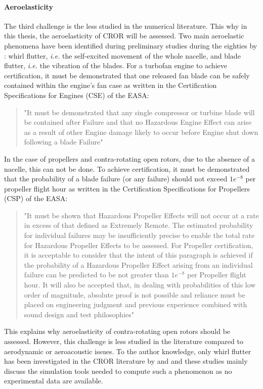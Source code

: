\paragraph{Aeroelasticity}
The third challenge is the less studied in the numerical literature.
This why in this thesis, the aeroelasticity of CROR will be assessed.
Two main aeroelastic phenomena have been identified during preliminary studies
during the eighties by \citet{Hager1988}: whirl flutter, \emph{i.e.} the self-excited
movement of the whole nacelle, and blade flutter, \emph{i.e.} the vibration
of the blades.
For a turbofan engine to achieve certification, it must be 
demonstrated that one released fan blade can be safely contained 
within the engine’s fan case as written in the 
Certification Specifications for Engines (CSE) of the EASA:
\begin{quote}
	"It must be demonstrated that any single compressor or turbine blade will be contained after Failure and 
that no Hazardous Engine Effect can arise as a result of other Engine damage likely to occur before 
Engine shut down following a blade Failure"
\end{quote}
In the case of propellers and contra-rotating open rotors, due to the absence of a nacelle,
this can not be done. To achieve certification, it must be demonstrated that the probability of a blade
failure (or any failure) should not exceed $1e^{-8}$ per propeller flight hour as written in 
the Certification Specifications for Propellers (CSP) of the EASA:
\begin{quote}
	"It must be shown that Hazardous Propeller Effects will not occur at a rate in excess of that defined 
as Extremely Remote. The estimated probability for individual failures may be insufficiently precise 
to enable the total rate for Hazardous Propeller Effects to be assessed. For Propeller certification, it 
is acceptable to consider that the intent of this paragraph is achieved if the probability of a 
Hazardous Propeller Effect arising from an individual failure can be predicted to be not greater than 
$1e^{-8}$ per Propeller flight hour. It will also be accepted that, in dealing with probabilities of this low 
order of magnitude, absolute proof is not possible and reliance must be placed on engineering 
judgment and previous experience combined with sound design and test philosophies" 
\end{quote}
This explains why aeroelasticity of contra-rotating open rotors should be assessed.
However, this challenge is less studied in the literature compared to 
aerodynamic or aeroacoustic issues.
To the author knowledge, only whirl flutter has been investigated
in the CROR literature by \citet{CISicot2011a} and 
\citet{Verley2013} and these studies mainly
discuss the simulation tools needed to compute such a phenomenon as
no experimental data are available.
